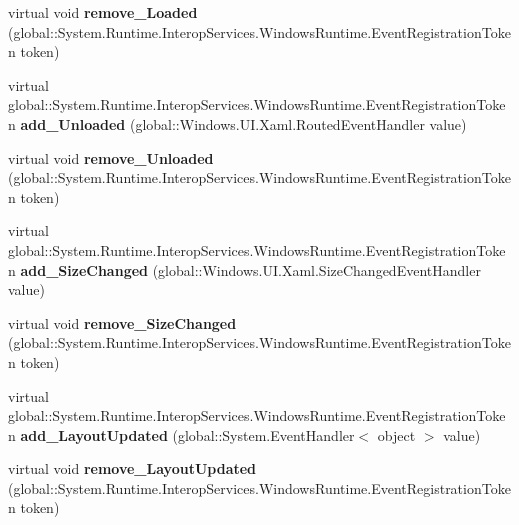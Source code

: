 \begin{DoxyCompactItemize}
virtual void {\bfseries remove\+\_\+\+Loaded} (global\+::\+System.\+Runtime.\+Interop\+Services.\+Windows\+Runtime.\+Event\+Registration\+Token token)
\item 
\mbox{\label{class_windows_1_1_u_i_1_1_xaml_1_1_framework_element_ac438721510bd4b3625cc0d47f3c3afc7}} 
virtual global\+::\+System.\+Runtime.\+Interop\+Services.\+Windows\+Runtime.\+Event\+Registration\+Token {\bfseries add\+\_\+\+Unloaded} (global\+::\+Windows.\+U\+I.\+Xaml.\+Routed\+Event\+Handler value)
\item 
\mbox{\label{class_windows_1_1_u_i_1_1_xaml_1_1_framework_element_a411df0e96e83d467a1e657159f3e681a}} 
virtual void {\bfseries remove\+\_\+\+Unloaded} (global\+::\+System.\+Runtime.\+Interop\+Services.\+Windows\+Runtime.\+Event\+Registration\+Token token)
\item 
\mbox{\label{class_windows_1_1_u_i_1_1_xaml_1_1_framework_element_aca30f924068a6a4384853203e07dcb3d}} 
virtual global\+::\+System.\+Runtime.\+Interop\+Services.\+Windows\+Runtime.\+Event\+Registration\+Token {\bfseries add\+\_\+\+Size\+Changed} (global\+::\+Windows.\+U\+I.\+Xaml.\+Size\+Changed\+Event\+Handler value)
\item 
\mbox{\label{class_windows_1_1_u_i_1_1_xaml_1_1_framework_element_aaa081b6b6e5a8977b1313e24490fd535}} 
virtual void {\bfseries remove\+\_\+\+Size\+Changed} (global\+::\+System.\+Runtime.\+Interop\+Services.\+Windows\+Runtime.\+Event\+Registration\+Token token)
\item 
\mbox{\label{class_windows_1_1_u_i_1_1_xaml_1_1_framework_element_a35323395e299a529e632a7801be6c440}} 
virtual global\+::\+System.\+Runtime.\+Interop\+Services.\+Windows\+Runtime.\+Event\+Registration\+Token {\bfseries add\+\_\+\+Layout\+Updated} (global\+::\+System.\+Event\+Handler$<$ object $>$ value)
\item 
\mbox{\label{class_windows_1_1_u_i_1_1_xaml_1_1_framework_element_a845b16fd198b79d626c5059bbe7859fe}} 
virtual void {\bfseries remove\+\_\+\+Layout\+Updated} (global\+::\+System.\+Runtime.\+Interop\+Services.\+Windows\+Runtime.\+Event\+Registration\+Token token)

\end{DoxyCompactItemize}
